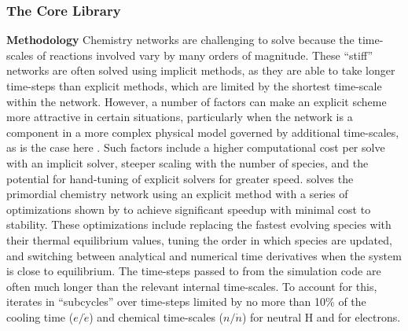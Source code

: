 \subsubsection{The Core Library}
\label{sec:core-library}

\noindent
{\bf Methodology}
Chemistry networks are challenging to solve because the time-scales of
reactions involved vary by many orders of magnitude.  These ``stiff''
networks are often solved using implicit methods, as they are able to
take longer time-steps than explicit methods, which are limited by the
shortest time-scale within the network.  However, a number of factors
can make an explicit scheme more attractive in certain situations,
particularly when the network is a component in a more complex physical
model governed by additional time-scales, as is the case here
\citep{2012JCoPh.231.5266G}.  Such factors include a higher
computational cost per solve with an implicit solver, steeper scaling
with the number of species, and the potential for hand-tuning of
explicit solvers for greater speed.  \grackle{} solves the primordial
chemistry network using an explicit method with a series of
optimizations shown by \citet{1997NewA....2..181A} to achieve
significant speedup with minimal cost to stability.  These
optimizations include replacing the fastest evolving species with
their thermal equilibrium values, tuning the order in which species
are updated, and switching between analytical and numerical time
derivatives when the system is close to equilibrium.  The time-steps
passed to \grackle{} from the simulation code are often much longer
than the relevant internal
time-scales.  To account for this, \grackle{} iterates in
``subcycles'' over time-steps limited by no more than 10\% of the
cooling time ($e/\dot{e}$) and chemical time-scales ($n/\dot{n}$) for
neutral H and for electrons.

